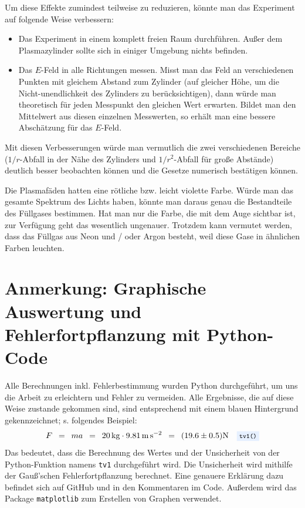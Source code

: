 \documentclass{article}
\newcommand{\widespace}{\enspace}
\newcommand{\wideeq}{\widespace = \widespace}
\newcommand{\coderef}[1]{%
    \text{\footnotesize \colorbox{codebg}{\texttt{#1()}}}%
}
\begin{document}
Um diese Effekte zumindest teilweise zu reduzieren, könnte man das Experiment auf folgende Weise verbessern:
\begin{itemize}
    \item Das Experiment in einem komplett freien Raum durchführen. Außer dem
    Plasmazylinder sollte sich in einiger Umgebung nichts befinden.
    \item Das $E$-Feld in alle Richtungen messen. Misst man das Feld an verschiedenen
    Punkten mit gleichem Abstand zum Zylinder (auf gleicher Höhe, um die
    Nicht-unendlichkeit des Zylinders zu berücksichtigen), dann würde man theoretisch
    für jeden Messpunkt den gleichen Wert erwarten. Bildet man den Mittelwert
    aus diesen einzelnen Messwerten, so erhält man eine bessere Abschätzung
    für das $E$-Feld.
\end{itemize}
Mit diesen Verbesserungen würde man vermutlich die zwei verschiedenen
Bereiche ($1/r$-Abfall in der Nähe des Zylinders und $1/r^2$-Abfall für große Abstände)
deutlich besser beobachten können und die Gesetze numerisch bestätigen können.

Die Plasmafäden hatten eine rötliche bzw. leicht violette Farbe.
Würde man das gesamte Spektrum des Lichts haben, könnte man daraus genau die
Bestandteile des Füllgases bestimmen. Hat man nur die Farbe, die mit dem Auge
sichtbar ist, zur Verfügung geht das wesentlich ungenauer.
Trotzdem kann vermutet werden, dass das Füllgas aus Neon und / oder Argon besteht,
weil diese Gase in ähnlichen Farben leuchten.


\newpage

\section{Anmerkung: Graphische Auswertung und Fehlerfortpflanzung mit Python-Code}

Alle Berechnungen inkl. Fehlerbestimmung wurden Python durchgeführt, um uns die Arbeit
zu erleichtern und Fehler zu vermeiden.
Alle Ergebnisse, die auf diese Weise zustande gekommen sind,
sind entsprechend mit einem \colorbox{codebg}{blauen Hintergrund} gekennzeichnet;
s. folgendes Beispiel:
\[
    F \wideeq ma \wideeq \qty{20}{\kg} \cdot \qty{9.81}{\meter\per\square\second}
    \wideeq (\num{19.6} \pm \num{0,5}) \unit{\N} \quad \coderef{tv1}
\]
Das bedeutet, dass die Berechnung des Wertes und der Unsicherheit von der
Python-Funktion namens \verb|tv1| durchgeführt wird.
Die Unsicherheit wird mithilfe der Gauß'schen Fehlerfortpflanzung berechnet.
Eine genauere Erklärung dazu befindet sich auf GitHub und in den Kommentaren im Code.
Außerdem wird das Package \texttt{matplotlib} zum Erstellen
von Graphen verwendet.
\end{document}
